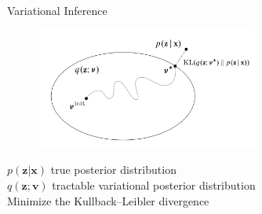 \documentclass[aspectratio=169]{beamer}
\begin{document}
\begin{frame}{Variational Inference}
    \begin{figure}
        \includegraphics[width=0.65\textwidth]{VI.png}
    \end{figure}
    \begin{center}
        $p(\textbf{z}|\textbf{x})$ true posterior distribution\\
        $q(\textbf{z};\textbf{v})$ tractable variational posterior distribution\\
        Minimize the Kullback–Leibler divergence
    \end{center}
\end{frame}
\end{document}
